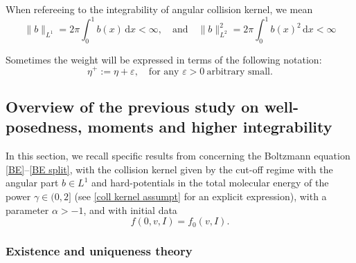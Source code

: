 \documentclass[11pt,a4paper]{amsart}
\newcommand{\md}{\mathrm{d}}
\begin{document}
When refereeing to the integrability of angular collision kernel,  we mean 
\begin{equation}\label{b integrablity}
	\| b \|_{L^1} = 2 \pi \int_{0}^1 b(x) \, \md x < \infty, \quad \text{and} \quad 	\| b \|_{L^2}^2 =  { 2 \pi }  \int_{0}^1 b(x)^2 \, \md x < \infty
\end{equation}


  Sometimes the weight will be expressed in terms of the following notation:
\begin{equation}\label{nmb plus}
	\eta^+ := \eta + \varepsilon, \quad \text{for any } \varepsilon>0 \ \text{arbitrary small}.
\end{equation}

\subsection{Overview of the previous study on  well-posedness, moments  and higher inte\-gra\-bility    }\label{Sec: Prelim}

In this section, we recall specific results from \cite{MC-Alonso-Gamba,MC-Alonso-Lp,MC-Alonso-Pesaro} concerning the Boltzmann equation \eqref{BE}--\eqref{BE split}, with the collision kernel given by the cut-off regime with the  angular part $b\in L^1$ and  hard-potentials in the total molecular energy  of the power $\gamma\in(0,2]$ (see \eqref{coll kernel assumpt} for an explicit expression), with  a parameter $\alpha>-1$, and with initial data
\begin{equation}\label{BE in}
	f(0, v, I)=f_0(v,I).
\end{equation}

 
\subsubsection{Existence and uniqueness theory}
\end{document}
